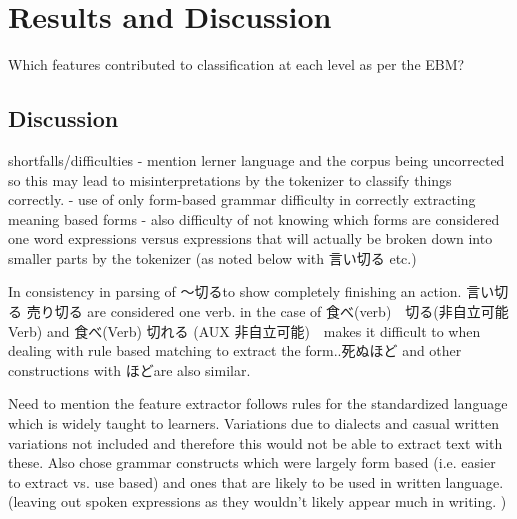 \chapter{Results and Discussion}
Which features contributed to classification at each level as per the EBM?
\section{Discussion}


shortfalls/difficulties
- mention lerner language and the corpus being uncorrected so this may lead to misinterpretations by the tokenizer
to classify things correctly.
- use of only form-based grammar difficulty in correctly extracting meaning based forms
- also difficulty of not knowing which forms are considered one word expressions versus expressions that will
actually be broken down into smaller parts by the tokenizer (as noted below with 言い切る etc.)

In consistency in parsing of 〜切るto show completely finishing an action. 言い切る 売り切る are considered one verb. in the
case of 食べ(verb)　切る(非自立可能Verb) and 食べ(Verb) 切れる (AUX 非自立可能)　makes it difficult to when dealing with rule based
matching to extract the form..死ぬほど and other constructions with ほどare also similar.

Need to mention the feature extractor follows rules for the standardized language which is widely taught to
learners. Variations due to dialects and casual written variations not included and therefore this would not be
able to extract text with these. Also chose grammar constructs which were largely form based (i.e. easier to extract
vs. use based) and ones that are likely to be used in written language. (leaving out spoken expressions as they
wouldn't likely appear much in writing. )